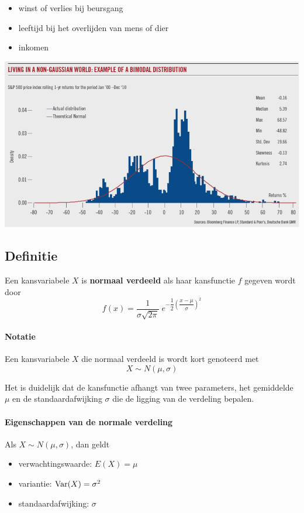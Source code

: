 \documentclass[a4paper,12pt, twoside]{article}
\begin{document}
\begin{itemize}
  \item winst of verlies bij beursgang
  \item leeftijd bij het overlijden van mens of dier
  \item inkomen
\end{itemize}
  \begin{center}
    \includegraphics[width=\textwidth]{non-normal}
  \end{center}

\pagebreak
\subsection{Definitie}

\begin{mdframed}
Een kansvariabele $X$ is {\bf normaal verdeeld} als haar kansfunctie $f$ gegeven wordt door
$$f(x)=\dfrac{1}{\sigma{\sqrt{2\pi}}}\;e^{-\dfrac{1}{2}\left(\dfrac{x-\mu}{\sigma}\right)^2}$$
\end{mdframed}

\paragraph*{Notatie}
Een kansvariabele $X$ die normaal verdeeld is wordt kort genoteerd met
$$X\sim N(\mu, \sigma)$$

Het is duidelijk dat de kansfunctie afhangt van twee parameters, het gemiddelde $\mu$ en de standaardafwijking $\sigma$ die de ligging van de verdeling bepalen.

\paragraph*{Eigenschappen van de normale verdeling}
\begin{mdframed}
Als $X\sim N(\mu, \sigma)$, dan geldt
\begin{itemize}
  \item verwachtingswaarde: $E(X)=\mu$
  \item variantie: $\Var(X)=\sigma^2$
  \item standaardafwijking: $\sigma$
\end{itemize}
\end{mdframed}
\end{document}
